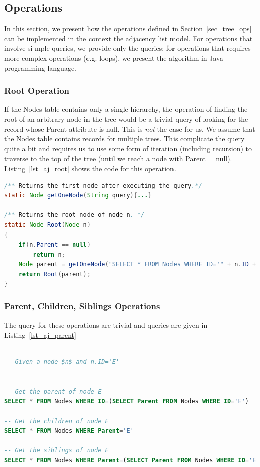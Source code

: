 \subsection{Operations}

In this section, we present how the operations defined in Section~\ref{sec_tree_ops} can be implemented in the context the adjacency list model. For operations that involve si
mple queries, we provide only the queries; for operations that requires more complex operations (e.g. loops), we present the algorithm in Java programming language.

\subsubsection{Root Operation}

If the Nodes table contains only a single hierarchy, the operation of finding the root of an arbitrary node in the tree would be a trivial query of looking for the record whose Parent attribute is null. This is \emph{not} the case for us. We assume that the Nodes table contains records for multiple trees. This complicate the query quite a bit and requires us to use some form of iteration (including recursion) to traverse to the top of the tree (until we reach a node with Parent = null). Listing~\ref{lst_aj_root} shows the code for this operation.

\begin{lstlisting}[language=java, style=java, caption=Root for Adjacency List, label=lst_aj_root]
/** Returns the first node after executing the query.*/
static Node getOneNode(String query){...}

/** Returns the root node of node n. */
static Node Root(Node n)
{
    if(n.Parent == null)
        return n;
    Node parent = getOneNode("SELECT * FROM Nodes WHERE ID='" + n.ID + "'");
    return Root(parent);
}

\end{lstlisting}


\subsubsection{Parent, Children, Siblings Operations}

The query for these operations are trivial and queries are given in Listing~\ref{lst_aj_parent}

\begin{lstlisting}[language=sql, caption={Parent, Children, and Sibling}, label=lst_aj_parent]
--
-- Given a node $n$ and n.ID='E'
--

-- Get the parent of node E
SELECT * FROM Nodes WHERE ID=(SELECT Parent FROM Nodes WHERE ID='E')

-- Get the children of node E
SELECT * FROM Nodes WHERE Parent='E'

-- Get the siblings of node E
SELECT * FROM Nodes WHERE Parent=(SELECT Parent FROM Nodes WHERE ID='E') AND ID != 'E'

\end{lstlisting}

